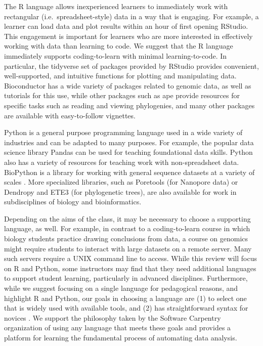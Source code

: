 The R language allows inexperienced learners to immediately work with rectangular (i.e.\ spreadsheet-style) data in a way that is engaging. 
For example, a learner can load data and plot results within an hour of first opening RStudio. 
This engagement is important for learners who are more interested in effectively working with data than learning to code. We suggest that the R language immediately supports coding-to-learn with minimal learning-to-code.
In particular, the tidyverse set of packages provided by RStudio provides 
convenient, well-supported, and intuitive functions for plotting and manipulating data.
Bioconductor \citep{bioconductor} has a wide variety of packages related to genomic data, as well as tutorials for this use, while other packages such as ape \citep{ape} 
provide resources for specific tasks such as reading and viewing phylogenies,
and many other packages are available with easy-to-follow vignettes.

Python is a general purpose programming language
used in a wide variety of industries %
and can be adapted to many purposes. 
For example, the popular data science library Pandas \citep{pandas} can be used for teaching foundational data skills.
Python also has a variety of resources for teaching work with non-spreadsheet data.
BioPython is a library for working with general sequence datasets at a variety of scales \citep{biopython}. 
More specialized libraries, such as Poretools \citep{poretools} (for Nanopore data) or Dendropy \citep{dendropy} and ETE3 \citep{ete3} (for phylogenetic trees), are also available for work in subdisciplines of biology and bioinformatics.

Depending on the aims of the class, it may be necessary to choose a supporting language, as well.
For example, in contrast to a coding-to-learn course in which biology students practice drawing conclusions from data, a course on genomics might require students to interact with large datasets on a remote server.
Many such servers require a UNIX command line to access.
While this review will focus on R and Python, some instructors may find that they need additional languages to support student learning, particularly in advanced disciplines.
Furthermore, while we suggest focusing on a single language for pedagogical reasons,
and highlight R and Python,
our goals in choosing a language are 
(1) to select one that is widely used with available tools, and
(2) has straightforward syntax for novices \citep{stefik}.
We support the philosophy taken by the Software Carpentry organization of
using any language that meets these goals and provides a platform for learning
the fundamental process of automating data analysis.

